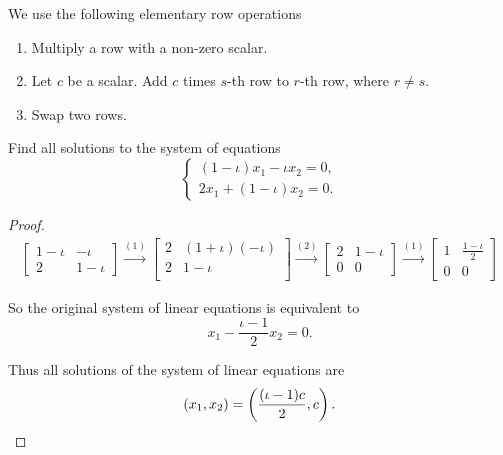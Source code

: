 We use the following elementary row operations
\begin{enumerate}[label={(\arabic*)}]
    \item Multiply a row with a non-zero scalar.
    \item Let $c$ be a scalar. Add $c$ times $s$-th row to $r$-th row, where $r\ne s$.
    \item Swap two rows.
\end{enumerate}

\begin{exercise}
    Find all solutions to the system of equations
    \[
        \begin{cases}
            (1 - \iota)x_{1} - \iota x_{2} = 0, \\
            2x_{1} + (1 - \iota) x_{2} = 0.
        \end{cases}
    \]
\end{exercise}

\begin{proof}
    \begingroup{}
    \allowdisplaybreaks{}
    \begin{align*}
        \begin{bmatrix}
            1 - \iota & -\iota    \\
            2         & 1 - \iota
        \end{bmatrix}
        \stackrel{(1)}{\rightarrow}
        \begin{bmatrix}
            2 & (1 + \iota)(-\iota) \\
            2 & 1 - \iota           \\
        \end{bmatrix}
        \stackrel{(2)}{\rightarrow}
        \begin{bmatrix}
            2 & 1 - \iota \\
            0 & 0
        \end{bmatrix}
        \stackrel{(1)}{\rightarrow}
        \begin{bmatrix}
            1 & \frac{1 - \iota}{2} \\
            0 & 0
        \end{bmatrix}
    \end{align*}
    \endgroup{}

    So the original system of linear equations is equivalent to
    \[
        x_{1} - \frac{\iota - 1}{2}x_{2} = 0.
    \]

    Thus all solutions of the system of linear equations are
    \[
        (x_{1}, x_{2}) = \left( \frac{(\iota - 1)c}{2}, c \right).\qedhere
    \]
\end{proof}

